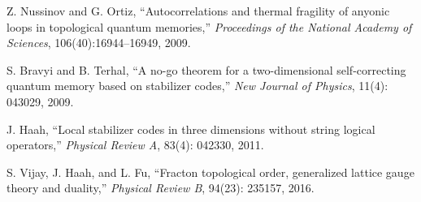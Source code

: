 \documentclass[12pt]{article}
\begin{document}
\begin{thebibliography}{99}
Z. Nussinov and G. Ortiz,
\newblock ``Autocorrelations and thermal fragility of anyonic loops in topological quantum memories,''
\newblock \emph{Proceedings of the National Academy of Sciences}, 106(40):16944--16949, 2009.

S. Bravyi and B. Terhal,
\newblock ``A no-go theorem for a two-dimensional self-correcting quantum memory based on stabilizer codes,''
\newblock \emph{New Journal of Physics}, 11(4): 043029, 2009.

J. Haah,
\newblock ``Local stabilizer codes in three dimensions without string logical operators,''
\newblock \emph{Physical Review A}, 83(4): 042330, 2011.

S. Vijay, J. Haah, and L. Fu,
\newblock ``Fracton topological order, generalized lattice gauge theory and duality,''
\newblock \emph{Physical Review B}, 94(23): 235157, 2016.

\end{thebibliography}
\end{document}
